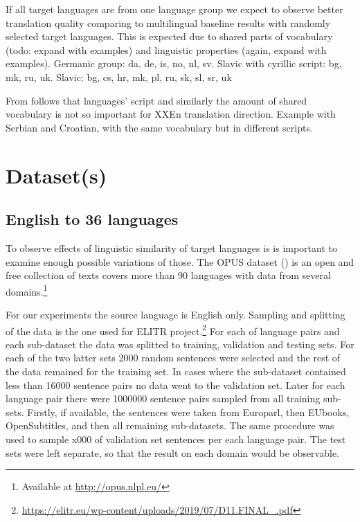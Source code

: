 If all target languages are from one language group we expect to observe
better translation quality comparing to multilingual baseline results 
with randomly selected target languages.
This is expected due to shared parts of vocabulary (todo: expand with examples)
and linguistic properties (again, expand with examples).
Germanic group: da, de, is, no, nl, sv.
Slavic with cyrillic script: bg, mk, ru, uk.
Slavic: bg, cs, hr, mk, pl, ru, sk, sl, sr, uk


From  follows that languages' script
and similarly the amount of shared vocabulary is not so important
for XX\to{}En translation direction.
Example with Serbian and Croatian, with the same vocabulary but
in different scripts.





\section{Dataset(s)}
\label{section:datasets}


\subsection{English to 36 languages}
\label{dataset:en-to-36}

To observe effects of linguistic similarity of target languages is is important to examine enough possible variations of those.
The OPUS dataset (\cite{TIEDEMANN12.463}) is an open and free collection of texts covers more than 90 languages with data from several domains.\footnote{Available at \url{http://opus.nlpl.eu/}} 

For our experiments the source language is English only.
Sampling and splitting of the data is the one used for ELITR project.\footnote{\url{https://elitr.eu/wp-content/uploads/2019/07/D11.FINAL_.pdf}}
For each of language pairs and each sub-dataset
the data was splitted to training, validation and testing sets.
For each of the two latter sets 2000 random sentences were selected
and the rest of the data remained for the training set.
In cases where the sub-dataset contained less than 16000 sentence pairs
no data went to the validation set.
Later for each language pair there were 1000000 sentence pairs
sampled from all training sub-sets.
Firstly, if available, the sentences were taken from Europarl,
then EUbooks, OpenSubtitles, and then all remaining sub-datasets.
The same procedure was used to sample x000 of validation set sentences
per each language pair.
The test sets were left separate, so that the result on each domain would be observable.

